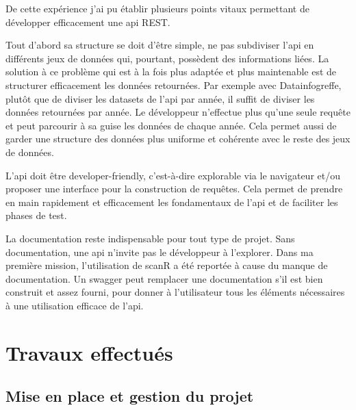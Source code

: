 \documentclass[french]{article}
\begin{document}
{De cette expérience j'ai pu établir plusieurs points vitaux permettant de développer efficacement une api REST. 

Tout d'abord sa structure se doit d'être simple, ne pas subdiviser l'api en différents jeux de données qui, pourtant, possèdent des informations liées.
La solution à ce problème qui est à la fois plus adaptée et plus maintenable est de structurer efficacement les données retournées.
Par exemple avec Datainfogreffe, plutôt que de diviser les datasets de l'api par année, il suffit de diviser les données retournées par année. Le développeur n'effectue plus qu'une seule requête et peut parcourir à sa guise les données de chaque année. Cela permet aussi de garder une structure des données plus uniforme et cohérente avec le reste des jeux de données.

L'api doit être developer-friendly, c'est-à-dire explorable via le navigateur et/ou proposer une interface pour la construction de requêtes. Cela permet de prendre en main rapidement et efficacement les fondamentaux de l'api et de faciliter les phases de test.

La documentation reste indispensable pour tout type de projet. Sans documentation, une api n'invite pas le développeur à l'explorer. Dans ma première mission, l'utilisation de scanR a été reportée à cause du manque de documentation. Un swagger peut remplacer une documentation s'il est bien construit et assez fourni, pour donner à l'utilisateur tous les éléments nécessaires à une utilisation efficace de l'api.

\section{Travaux effectués}

\subsection{Mise en place et gestion du projet}

}
\end{document}

